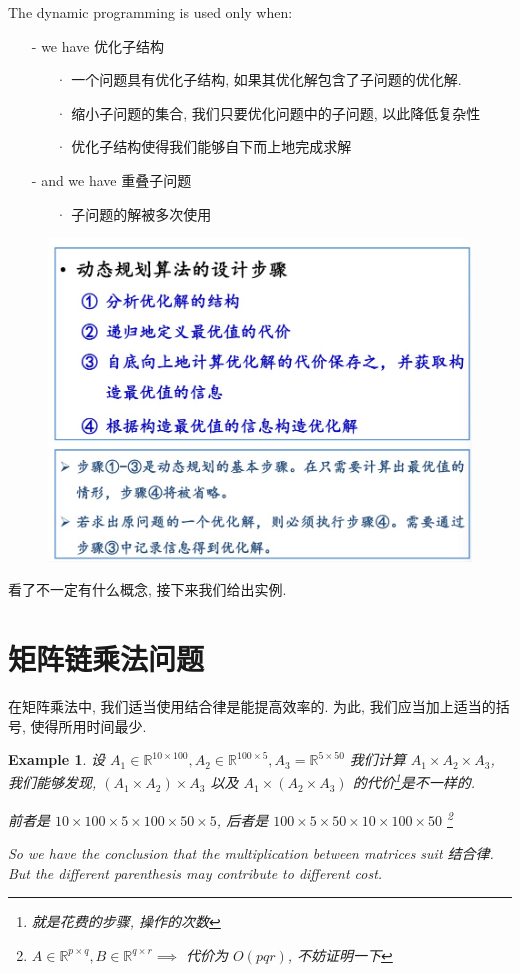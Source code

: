 \documentclass[a4paper, 10pt]{ctexart} %
\newtheorem{example}{Example}
\begin{document}
The dynamic programming is used only when:
\begin{enumerate}
    \item[-] we have 优化子结构
    \begin{enumerate}
        \item[·]一个问题具有优化子结构, 如果其优化解包含了子问题的优化解.
        \item[·]缩小子问题的集合, 我们只要优化问题中的子问题, 以此降低复杂性
        \item[·]优化子结构使得我们能够自下而上地完成求解  
    \end{enumerate}
    \item[-] and we have 重叠子问题
    \begin{enumerate}
        \item[·]子问题的解被多次使用
    \end{enumerate}
\end{enumerate}

\begin{figure}[H]
    \centering
    \includegraphics[scale  = 0.5]{5.jpg}
\end{figure}

看了不一定有什么概念, 接下来我们给出实例.
\section{矩阵链乘法问题}
在矩阵乘法中, 我们适当使用结合律是能提高效率的. 
为此, 我们应当加上适当的括号, 使得所用时间最少.
\begin{example}
设 
$A_1 \in \mathbb R ^{10 \times 100}, 
A_2 \in \mathbb R ^{100 \times 5} , 
A_3= \mathbb R ^{5 \times 50}$
我们计算 $A_1 \times A_2 \times A_3$, 我们能够发现, 
$\left(A_1 \times A_2  \right) \times A_3 $ 以及 $A_1 \times \left(A_2 \times A_3\right)$
的代价\footnote{就是花费的步骤, 操作的次数}是不一样的.

前者是 $10 \times 100 \times 5 \times 100 \times 50 \times 5$, 后者是 $100 \times 5 \times 50 \times 10 \times 100 \times 50$
\footnote{$A \in \mathbb R ^{p\times q } , B \in 
\mathbb{R} ^{q \times r}\implies$ 代价为 $O\left(pqr\right)$, 不妨证明一下}

So we have the conclusion that the multiplication between matrices suit 结合律.
But the different parenthesis may contribute to 
different cost.
\end{example}
\end{document}
